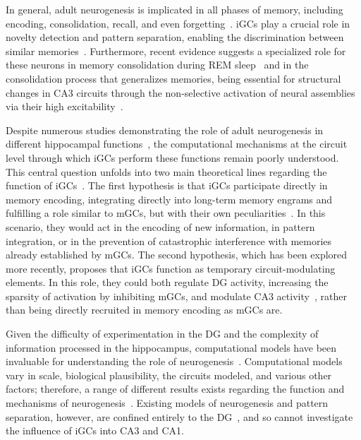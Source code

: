 In general, adult neurogenesis is implicated in all phases of memory, including encoding, consolidation, recall, and even
forgetting~\parencite{chavanMemory2025}\@. iGCs play a crucial role in novelty detection and pattern separation, enabling the
discrimination between similar memories~\parencite{nakashibaYoung2012, mchughAdultborn2022}. Furthermore, recent evidence suggests
a specialized role for these neurons in memory consolidation during REM sleep~\parencite{chavanMemory2025} and in the
consolidation process that generalizes memories, being essential for structural changes in CA3 circuits through the non-selective
activation of neural assemblies via their high excitability~\parencite{koSystems2025}.

Despite numerous studies demonstrating the role of adult neurogenesis in different hippocampal
functions~\parencite{chavanMemory2025, berdugo-vegaSharpening2023}, the computational mechanisms at the circuit level through
which iGCs perform these functions remain poorly understood. This central question unfolds into two main theoretical lines
regarding the function of iGCs~\parencite{berdugo-vegaSharpening2023}. The first hypothesis is that iGCs participate directly in
memory encoding, integrating directly into long-term memory engrams and fulfilling a role similar to mGCs, but with their own
peculiarities~\parencite{piattiNeurogenesis2013}. In this scenario, they would act in the encoding of new information, in pattern
integration, or in the prevention of catastrophic interference with memories already established by mGCs. The second hypothesis,
which has been explored more recently, proposes that iGCs function as temporary circuit-modulating elements. In this role, they
could both regulate DG activity, increasing the sparsity of activation by inhibiting mGCs, and modulate CA3
activity~\parencite{aimoneComputational2016, berdugo-vegaSharpening2023, folszAdultborn2023}, rather than being directly recruited
in memory encoding as mGCs are.

Given the difficulty of experimentation in the DG and the complexity of information processed in the hippocampus, computational
models have been invaluable for understanding the role of neurogenesis~\parencite{aimoneComputational2016}. Computational models
vary in scale, biological plausibility, the circuits modeled, and various other factors; therefore, a range of different results
exists regarding the function and mechanisms of neurogenesis~\parencite{aimoneComputational2016, berdugo-vegaSharpening2023}.
Existing models of neurogenesis and pattern separation, however, are confined entirely to the DG~\parencite{chavlisDendrites2017,
kimEffect2024, yangDynamic2025}, and so cannot investigate the influence of iGCs into CA3 and CA1.

